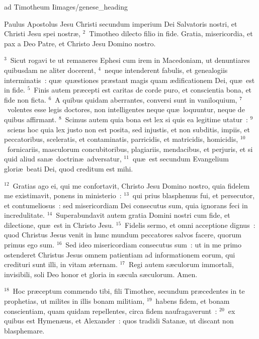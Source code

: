 {ad Timotheum I}{images/genese_heading}


\bchapter
\lettrine[lines=6,image=true,loversize=0.05,lraise=-0.03]{P}{}aulus Apostolus Jesu Christi secundum imperium Dei Salvatoris nostri, et Christi Jesu spei nostr\ae ,
${}^{2}$~Timotheo dilecto filio in fide. Gratia, misericordia, et pax a Deo Patre, et Christo Jesu Domino nostro.


${}^{3}$~Sicut rogavi te ut remaneres Ephesi cum irem in Macedoniam, ut denuntiares quibusdam ne aliter docerent,
${}^{4}$~neque intenderent fabulis, et genealogiis interminatis~: qu\ae\ qu\ae stiones pr\ae stant magis quam \ae dificationem Dei, qu\ae\ est in fide.
${}^{5}$~Finis autem pr\ae cepti est caritas de corde puro, et conscientia bona, et fide non ficta.
${}^{6}$~A quibus quidam aberrantes, conversi sunt in vaniloquium,
${}^{7}$~volentes esse legis doctores, non intelligentes neque qu\ae\ loquuntur, neque de quibus affirmant.
${}^{8}$~Scimus autem quia bona est lex si quis ea legitime utatur~:
${}^{9}$~sciens hoc quia lex justo non est posita, sed injustis, et non subditis, impiis, et peccatoribus, sceleratis, et contaminatis, parricidis, et matricidis, homicidis,
${}^{10}$~fornicariis, masculorum concubitoribus, plagiariis, mendacibus, et perjuris, et si quid aliud san\ae\ doctrin\ae\ adversatur,
${}^{11}$~qu\ae\ est secundum Evangelium glori\ae\ beati Dei, quod creditum est mihi.


${}^{12}$~Gratias ago ei, qui me confortavit, Christo Jesu Domino nostro, quia fidelem me existimavit, ponens in ministerio~:
${}^{13}$~qui prius blasphemus fui, et persecutor, et contumeliosus~: sed misericordiam Dei consecutus sum, quia ignorans feci in incredulitate.
${}^{14}$~Superabundavit autem gratia Domini nostri cum fide, et dilectione, qu\ae\ est in Christo Jesu.
${}^{15}$~Fidelis sermo, et omni acceptione dignus~: quod Christus Jesus venit in hunc mundum peccatores salvos facere, quorum primus ego sum.
${}^{16}$~Sed ideo misericordiam consecutus sum~: ut in me primo ostenderet Christus Jesus omnem patientiam ad informationem eorum, qui credituri sunt illi, in vitam \ae ternam.
${}^{17}$~Regi autem s\ae culorum immortali, invisibili, soli Deo honor et gloria in s\ae cula s\ae culorum. Amen.


${}^{18}$~Hoc pr\ae ceptum commendo tibi, fili Timothee, secundum pr\ae cedentes in te prophetias, ut milites in illis bonam militiam,
${}^{19}$~habens fidem, et bonam conscientiam, quam quidam repellentes, circa fidem naufragaverunt~:
${}^{20}$~ex quibus est Hymen\ae us, et Alexander~: quos tradidi Satan\ae , ut discant non blasphemare.

